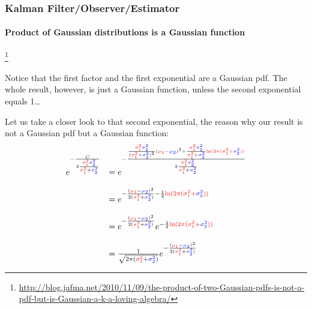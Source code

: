 \begin{frame}[plain]
\frametitle{Kalman Filter/Observer/Estimator}
\framesubtitle{Product of Gaussian distributions is a Gaussian function}

\footnote{\tiny\hspace{-0.23in} \hspace{-0.25in}
\href{http://blog.jafma.net/2010/11/09/the-product-of-two-Gaussian-pdfs-is-not-a-pdf-but-is-Gaussian-a-k-a-loving-algebra/}{http://blog.jafma.net/2010/11/09/the-product-of-two-Gaussian-pdfs-is-not-a-pdf-but-is-Gaussian-a-k-a-loving-algebra/}}
\begin{changemargin}{-1.35in}{0in}
\scriptsize
Notice that the first factor and the first exponential are a Gaussian pdf. The whole result, however, is just a Gaussian function, unless the second exponential equals 1…

Let us take a closer look to that second exponential, the reason why our result is not a Gaussian pdf but a Gaussian function:
\begin{equation*}
\begin{array}{rlllllll}
e^{- \frac {C}{2 \frac{{\color{red}\sigma^2_1} {\color{blue}\sigma^2_2}}{{\color{red}\sigma^2_1} + {\color{blue}\sigma^2_2}}} }&=   e^{- \frac { \frac { {\color{red}\sigma^2_1} {\color{blue}\sigma^2_2} }{ ({\color{red}\sigma^2_1} + {\color{blue}\sigma^2_2})^2 } ({{\color{red}\mu_1}} - {{\color{blue}\mu_2}} )^2+\frac { {\color{red}\sigma^2_1} {\color{blue}\sigma^2_2} }{ {\color{red}\sigma^2_1} + {\color{blue}\sigma^2_2} } {\color{red}\ln ( 2 \pi ( {\color{red}\sigma^2_1} + {\color{blue}\sigma^2_2} ) )} }        {2 \frac{{\color{red}\sigma^2_1} {\color{blue}\sigma^2_2}}{{\color{red}\sigma^2_1} + {\color{blue}\sigma^2_2}}} }\\\\
&=e^{- \frac { ({{\color{red}\mu_1}} - {{\color{blue}\mu_2}} )^2 }{ 2 ({\color{red}\sigma^2_1} + {\color{blue}\sigma^2_2}) }         - \frac{1}{2} {\color{red}\ln ( 2 \pi ( {\color{red}\sigma^2_1} + {\color{blue}\sigma^2_2} ) )}       } \\\\
&=   e^{- \frac { ({{\color{red}\mu_1}} - {{\color{blue}\mu_2}} )^2 }{ 2( {\color{red}\sigma^2_1} + {\color{blue}\sigma^2_2} )} }   e^{- \frac{1}{2} {\color{red}\ln ( 2 \pi ( {\color{red}\sigma^2_1} + {\color{blue}\sigma^2_2} ) )} } \\\\
&= \frac {1}{ \sqrt{2 \pi ({\color{red}\sigma^2_1} + {\color{blue}\sigma^2_2})} }   e^{- \frac { ({{\color{red}\mu_1}} - {{\color{blue}\mu_2}} )^2 }{ 2({\color{red}\sigma^2_1} + {\color{blue}\sigma^2_2}) } }
\end{array}
\end{equation*}
\end{changemargin}
\end{frame}





